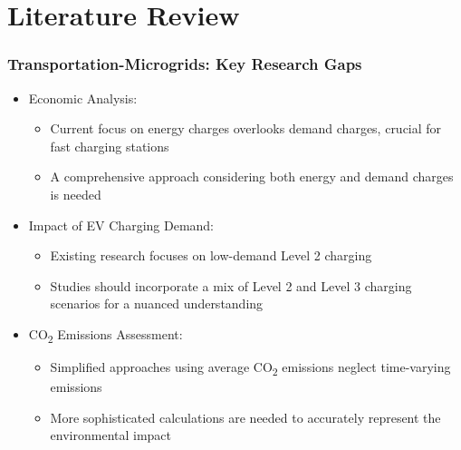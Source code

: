 \documentclass[aspectratio=169, 8 pt]{beamer}
\begin{document}
\section{Literature Review}

	\begin{frame}
		\frametitle{Transportation-Microgrids: Key Research Gaps}
		\Large
		\begin{itemize}
			\item Economic Analysis:
			\begin{itemize} \large
				\item Current focus on energy charges overlooks demand charges, crucial for fast charging stations
				\item A comprehensive approach considering both energy and demand charges is needed
			\end{itemize}
			\item Impact of EV Charging Demand:
			\begin{itemize} \large
				\item Existing research focuses on low-demand Level 2 charging
				\item Studies should incorporate a mix of Level 2 and Level 3 charging scenarios for a nuanced understanding
			\end{itemize}
			\item CO\textsubscript{2} Emissions Assessment:
			\begin{itemize} \large
				\item Simplified approaches using average CO\textsubscript{2} emissions neglect time-varying emissions
				\item More sophisticated calculations are needed to accurately represent the environmental impact
			\end{itemize}  
		\end{itemize}
	\end{frame}
	
\end{document}
